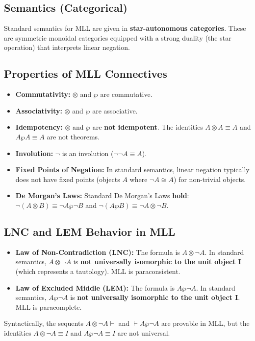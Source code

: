 	\subsection{Semantics (Categorical)}
	Standard semantics for MLL are given in \textbf{star-autonomous categories}. These are symmetric monoidal categories equipped with a strong duality (the star operation) that interprets linear negation.
	
	\subsection{Properties of MLL Connectives}
	\begin{itemize}
		\item \textbf{Commutativity:} \(\otimes\) and \(\wp\) are commutative.
		\item \textbf{Associativity:} \(\otimes\) and \(\wp\) are associative.
		\item \textbf{Idempotency:} \(\otimes\) and \(\wp\) are \textbf{not idempotent}. The identities \(A \otimes A \equiv A\) and \(A \wp A \equiv A\) are not theorems.
		\item \textbf{Involution:} \(\neg\) is an involution (\(\neg \neg A \equiv A\)).
		\item \textbf{Fixed Points of Negation:} In standard semantics, linear negation typically does not have fixed points (objects \(A\) where \(\neg A \cong A\)) for non-trivial objects.
		\item \textbf{De Morgan's Laws:} Standard De Morgan's Laws \textbf{hold}: \(\neg(A \otimes B) \equiv \neg A \wp \neg B\) and \(\neg(A \wp B) \equiv \neg A \otimes \neg B\).
	\end{itemize}
	
	\subsection{LNC and LEM Behavior in MLL}
	\begin{itemize}
		\item \textbf{Law of Non-Contradiction (LNC):} The formula is \(A \otimes \neg A\). In standard semantics, \(A \otimes \neg A\) is \textbf{not universally isomorphic to the unit object I} (which represents a tautology). MLL is paraconsistent.
		\item \textbf{Law of Excluded Middle (LEM):} The formula is \(A \wp \neg A\). In standard semantics, \(A \wp \neg A\) is \textbf{not universally isomorphic to the unit object I}. MLL is paracomplete.
	\end{itemize}
	Syntactically, the sequents \(A \otimes \neg A \vdash\) and \(\vdash A \wp \neg A\) are provable in MLL, but the identities \(A \otimes \neg A \equiv I\) and \(A \wp \neg A \equiv I\) are not universal.
	
